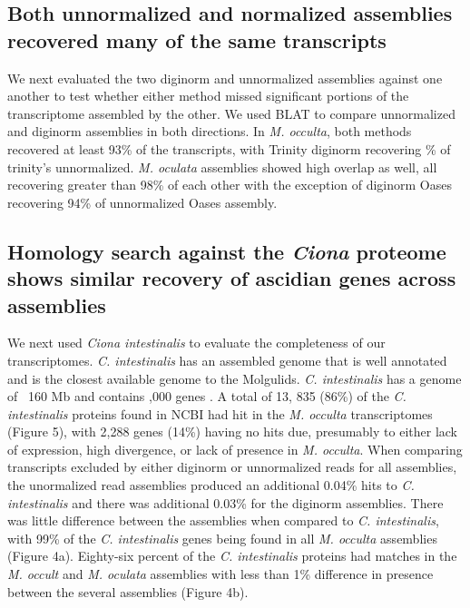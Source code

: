 \documentclass[fleqn,10pt]{wlpeerj}
\begin{document}
\subsection{Both unnormalized and normalized assemblies recovered many of the same transcripts}
We next evaluated the two diginorm and unnormalized assemblies against one another to test whether either method missed significant portions of the transcriptome assembled by the other. We used BLAT to compare unnormalized and diginorm assemblies in both directions. In \textit{M. occulta}, both methods recovered at least 93\% of the transcripts, with Trinity diginorm recovering \% of trinity's unnormalized. \textit{M. oculata} assemblies showed high overlap as well, all recovering greater than 98\% of each other with the exception of diginorm Oases recovering 94\% of unnormalized Oases assembly.

\subsection{Homology search against the \textit{Ciona} proteome shows similar recovery of ascidian genes across assemblies}
We next used \textit{Ciona intestinalis} to evaluate the completeness of our transcriptomes. \textit{C. intestinalis} has an assembled genome that is well annotated and is the closest available genome to the Molgulids. \textit{C. intestinalis} has a genome of ~160 Mb and contains ,000 genes \citep{satoh_surfing_2005}. A total of 13, 835 (86\%) of the \textit{C. intestinalis} proteins found in NCBI had hit in the \textit{M. occulta} transcriptomes (Figure 5), with 2,288 genes (14\%) having no hits due, presumably to either lack of expression, high divergence, or lack of presence in \textit{M. occulta}. When comparing transcripts excluded by either diginorm or unnormalized reads for all assemblies, the unormalized read assemblies produced an additional 0.04\% hits to \textit{C. intestinalis} and there was additional 0.03\% for the diginorm assemblies. There was little difference between the assemblies when compared to \textit{C. intestinalis}, with 99\% of the \textit{C. intestinalis} genes being found in all \textit{M. occulta} assemblies (Figure 4a). Eighty-six percent of the \textit{C. intestinalis} proteins had matches in the \textit{M. occult} and \textit{M. oculata} assemblies with less than 1\% difference in presence between the several assemblies (Figure 4b).
     
\end{document}
